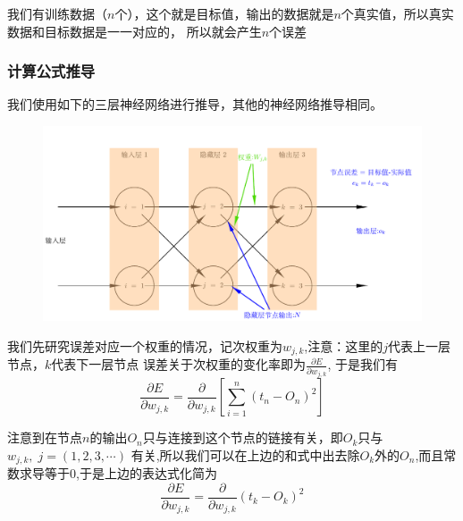 \documentclass[12pt]{article}
\begin{document}
    我们有训练数据（$n$个），这个就是目标值，输出的数据就是$n$个真实值，所以真实数据和目标数据是一一对应的，
    所以就会产生$n$个误差

    \subsubsection{计算公式推导}
    我们使用如下的三层神经网络进行推导，其他的神经网络推导相同。
    \begin{figure}[!htb]
        \centering
        \includegraphics[scale=0.5]{./picture/Nueral_Net.pdf}    
    \end{figure}

   我们先研究误差对应一个权重的情况，记次权重为$w_{j,k}$,注意：这里的$j$代表上一层节点，$k$代表下一层节点
   误差关于次权重的变化率即为$\frac{\partial E}{\partial w_{j,k}}$, 于是我们有
   \begin{equation}
        \frac{\partial E}{\partial w_{j,k}} 
         = \frac{\partial}{\partial w_{j,k}}\left[\sum_{i=1}^{n}{(t_n-O_n)^2}\right]  
   \end{equation}

   注意到在节点$n$的输出$O_n$只与连接到这个节点的链接有关，即$O_k$只与$w_{j,k},\; j =(1, 2, 3,\cdots)$
   有关,所以我们可以在上边的和式中出去除$O_k$外的$O_n$,而且常数求导等于0,于是上边的表达式化简为
   \begin{equation}
    \frac{\partial E}{\partial w_{j,k}} 
     = \frac{\partial}{\partial w_{j,k}}{(t_k-O_k)^2}  \nonumber
    \end{equation}
\end{document}
